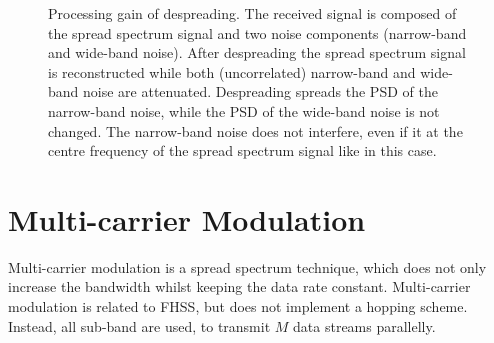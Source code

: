 \begin{refsection}
\begin{figure}[H]

	\caption[Processing gain of despreading]{Processing gain of despreading. The received signal is composed of the spread spectrum signal and two noise components (narrow-band and wide-band noise). After despreading the spread spectrum signal is reconstructed while both (uncorrelated) narrow-band and wide-band noise are attenuated. Despreading spreads the \acs{PSD} of the narrow-band noise, while the \ac{PSD} of the wide-band noise is not changed. The narrow-band noise does not interfere, even if it at the centre frequency of the spread spectrum signal like in this case.}
\end{figure}

\section{Multi-carrier Modulation}

Multi-carrier modulation is a spread spectrum technique, which does not only increase the bandwidth whilst keeping the data rate constant. Multi-carrier modulation is related to \ac{FHSS}, but does not implement a hopping scheme. Instead, all sub-band are used, to transmit $M$ data streams parallelly.


\end{refsection}
